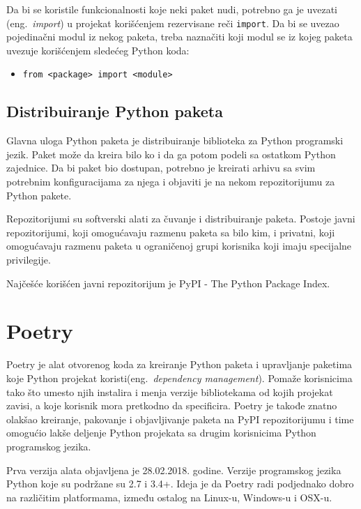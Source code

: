\documentclass[12pt]{report}
\begin{document}
Da bi se koristile funkcionalnosti koje neki paket nudi, potrebno ga je uvezati (eng.\ \textit{import}) u projekat korišćenjem rezervisane reči \texttt{import}. Da bi se uvezao pojedinačni modul iz nekog paketa, treba naznačiti koji modul se iz kojeg paketa uvezuje korišćenjem sledećeg Python koda:

\begin{itemize}
    \item \texttt{from <package> import <module>}
\end{itemize}

\subsection{Distribuiranje Python paketa}

Glavna uloga Python paketa je distribuiranje biblioteka za Python programski jezik. Paket može da kreira bilo ko i da ga potom podeli sa ostatkom Python zajednice. Da bi paket bio dostupan, potrebno je kreirati arhivu sa svim potrebnim konfiguracijama za njega i objaviti je na nekom repozitorijumu za Python pakete.

Repozitorijumi su softverski alati za čuvanje i distribuiranje paketa. Postoje javni repozitorijumi, koji omogućavaju razmenu paketa sa bilo kim, i privatni, koji omogućavaju razmenu paketa u ograničenoj grupi korisnika koji imaju specijalne privilegije.

Najčešće korišćen javni repozitorijum je PyPI \cite{pypi}  - The Python Package Index.

\section{Poetry}
Poetry \cite{poetry} je alat otvorenog koda za kreiranje Python paketa i upravljanje paketima koje Python projekat koristi(eng.\ \textit{dependency management}). Pomaže korisnicima tako što umesto njih instalira i menja verzije  bibliotekama od kojih projekat zavisi, a koje korisnik mora pretkodno da specificira. Poetry je takođe znatno olakšao kreiranje, pakovanje i objavljivanje paketa na PyPI repozitorijumu i time omogućio lakše deljenje Python projekata sa drugim korisnicima Python programskog jezika.

Prva verzija alata objavljena je 28.02.2018. godine. Verzije programskog jezika Python koje su podržane su 2.7 i 3.4+. Ideja je da Poetry radi podjednako dobro na različitim platformama, između ostalog na Linux-u, Windows-u i OSX-u.
\end{document}
